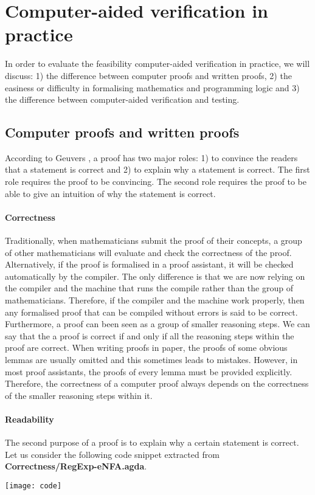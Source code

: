 \section{Computer-aided verification in practice}
\par In order to evaluate the feasibility computer-aided verification in
practice, we will discuss: 1) the difference between computer proofs and written proofs, 2) the easiness or
difficulty in formalising mathematics and programming logic and 3) the
difference between computer-aided verification and testing. 


\subsection{Computer proofs and written proofs}
\par According to Geuvers \cite{geuvers2009}, a proof has two major roles: 1)
to convince the readers that a statement is correct and 2) to explain
why a statement is correct. The first role requires the proof to be
convincing. The second role requires the proof to be able to give an
intuition of why the statement is correct. 

\paragraph{Correctness} Traditionally, when mathematicians submit
the proof of their concepts, a group of other mathematicians will
evaluate and check the correctness of the proof. Alternatively, if the
proof is formalised in a proof assistant, it will be checked 
automatically by the compiler. The only difference is that we are now
relying on the compiler and the machine that runs the compile rather
than the group of mathematicians. Therefore, if the compiler and the
machine work properly, then any formalised proof that
can be compiled without errors is said to be correct. Furthermore, a
proof can been seen as a group of smaller reasoning steps. We can say that the a proof is correct if and only if all the
reasoning steps within the proof are correct. When writing proofs in paper, the proofs of
some obvious lemmas are usually omitted and this sometimes leads to mistakes. However, in
most proof assistants, the proofs of every lemma must be provided explicitly. Therefore, the correctness of
a computer proof always depends on the correctness of the smaller reasoning steps within it. 

\paragraph{Readability} The second purpose of a proof is to explain why
a certain statement is correct. Let us consider the following code
snippet extracted from \textbf{Correctness/RegExp-eNFA.agda}. 
\begin{center} \texttt{[image: code]} \end{center}

